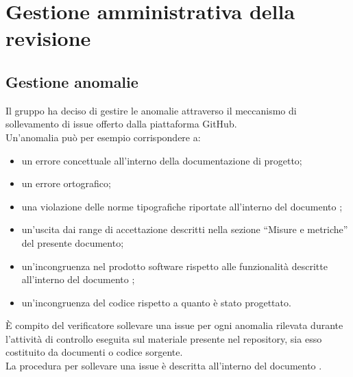 
\section{Gestione amministrativa della revisione}
	\subsection{Gestione anomalie}
		Il gruppo ha deciso di gestire le anomalie attraverso il meccanismo di sollevamento di issue offerto dalla piattaforma GitHub.\\
		Un'anomalia può per esempio corrispondere a:
		\begin{itemize}
			\item un errore concettuale all'interno della documentazione di progetto;
			\item un errore ortografico;
			\item una violazione delle norme tipografiche riportate all'interno del documento ;
			\item un'uscita dai range di accettazione descritti nella sezione “Misure e metriche” del presente documento;
			\item un'incongruenza nel prodotto software rispetto alle funzionalità descritte all'interno del documento ;
			\item un'incongruenza del codice rispetto a quanto è stato progettato.
		\end{itemize}
		È compito del verificatore sollevare una issue per ogni anomalia rilevata durante l'attività di controllo eseguita sul materiale presente 
		nel repository, sia esso costituito da documenti o codice sorgente.\\
		La procedura per sollevare una issue è descritta all'interno del documento .
